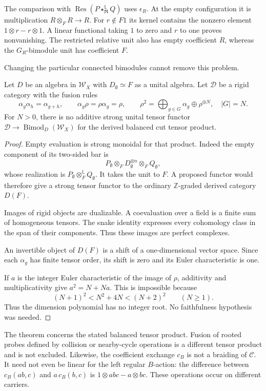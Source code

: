The comparison with $\operatorname{Res}(P\star^{\mathbb L}_{\mathfrak R}Q)$
uses $\epsilon_R$. At the empty configuration it is multiplication
$R\otimes_F R\to R$. For $r\notin F1$ its kernel contains the nonzero
element $1\otimes r-r\otimes1$. A linear functional taking $1$ to zero
and $r$ to one proves nonvanishing. The restricted relative unit also has
empty coefficient $R$, whereas the $G_R$-bimodule unit has coefficient $F$.

Changing the particular connected bimodules cannot remove this problem.
\begin{theorem}\label{v4-arith:asi:empty-obstruction}
Let $D$ be an algebra in $\mathcal W_X$ with $D_\emptyset\simeq F$ as a
unital algebra.
Let $\mathcal D$ be a rigid category with the fusion rules
\[
 \alpha_g\alpha_h=\alpha_{g+h},\qquad
 \alpha_g\rho=\rho\alpha_g=\rho,\qquad
 \rho^2=\bigoplus_{g\in G}\alpha_g\oplus\rho^{\oplus N},\quad |G|=N.
\]
For $N>0$, there is no additive strong unital tensor functor
$\mathcal D\to\operatorname{Bimod}_D(\mathcal W_X)$ for the derived
balanced cut tensor product.
\end{theorem}
\begin{proof}
Empty evaluation is strong monoidal for that product. Indeed the empty
component of its two-sided bar is
\[
 P_\emptyset\otimes_F D_\emptyset^{\otimes n}\otimes_F Q_\emptyset,
\]
whose realization is $P_\emptyset\otimes_F^{\mathbb L}Q_\emptyset$.
It takes the unit to $F$. A proposed functor would therefore give a
strong tensor functor to the ordinary $\mathbb Z$-graded derived category
$D(F)$.

Images of rigid objects are dualizable. A coevaluation over a field is
a finite sum of homogeneous tensors. The snake identity expresses every
cohomology class in the span of their components. Thus these images are
perfect complexes.

An invertible object of $D(F)$ is a shift of a one-dimensional vector
space. Since each $\alpha_g$ has finite tensor order, its shift is zero
and its Euler characteristic is one.

If $a$ is the integer Euler
characteristic of the image of $\rho$, additivity and multiplicativity
give $a^2=N+Na$. This is impossible because
\[
 (N+1)^2<N^2+4N<(N+2)^2\qquad(N\ge1).
\]
Thus the dimension polynomial has no integer root. No faithfulness
hypothesis was needed.
\end{proof}

The theorem concerns the stated balanced tensor product. Fusion of rooted
probes defined by collision or nearby-cycle operations is a different
tensor product and is not excluded. Likewise, the coefficient exchange
$c_B$ is not a braiding of $\mathcal C$. It need not even be linear for
the left regular $B$-action: the difference between $c_B(ab,c)$ and
$a\,c_B(b,c)$ is $1\otimes abc-a\otimes bc$. These operations occur on
different carriers.

